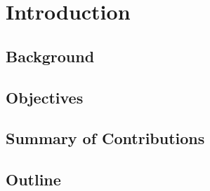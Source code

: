 \section{Introduction}
\subsection{Background}
\subsection{Objectives}
\subsection{Summary of Contributions}
\subsection{Outline}

\pagebreak
